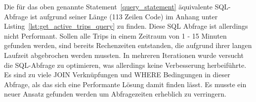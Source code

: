   Die für das oben genannte Statement~\ref{query_statement} äquivalente SQL-Abfrage ist aufgrund seiner Länge (113 Zeilen Code) im Anhang unter Listing~\ref{lst:get_active_trips_query} zu finden. Diese SQL Abfrage ist allerdings nicht Performant. Sollen alle Trips in einem Zeitraum von 1 - 15 Minuten gefunden werden, sind bereits Rechenzeiten entstanden, die aufgrund ihrer langen Laufzeit abgebrochen werden mussten. In mehreren Iterationen wurde versucht die SQL-Abfrage zu optimieren, was allerdings keine Verbesserung herbeiführte. Es sind zu viele JOIN Verknüpfungen und WHERE Bedingungen in dieser Abfrage, als das sich eine Performante Lösung damit finden lässt. Es musste ein neuer Ansatz gefunden werden um Abfragezeiten erheblich zu verringern.
  
